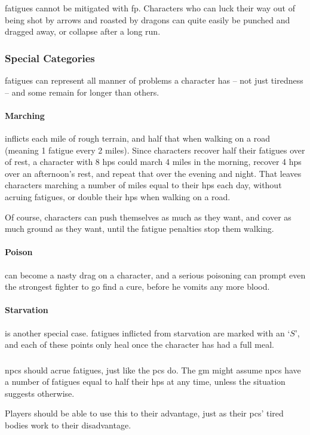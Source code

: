 \begin{multicols}{2}
\Glspl{fatigue} cannot be mitigated with \gls{fp}. Characters who can luck their way out of being shot by arrows and roasted by dragons can quite easily be punched and dragged away, or collapse after a long run.

\subsubsection{Special Categories}

\Glspl{fatigue} can represent all manner of problems a character has -- not just tiredness -- and some remain for longer than others.

\paragraph{Marching} inflicts  each mile of rough terrain, and half that when walking on a road (meaning 1 \gls{fatigue} every 2 miles).
Since characters recover half their \glspl{fatigue} over  of rest, a character with 8 \glspl{hp} could march 4 miles in the morning, recover 4 \glspl{hp} over an afternoon's rest, and repeat that over the evening and night.
That leaves characters marching a number of miles equal to their \glspl{hp} each day, without acruing \glspl{fatigue}, or double their \glspl{hp} when walking on a road.

Of course, characters can push themselves as much as they want, and cover as much ground as they want, until the \gls{fatigue} penalties stop them walking.

\paragraph{Poison} can become a nasty drag on a character, and a serious poisoning can prompt even the strongest fighter to go find a cure, before he vomits any more blood.

\paragraph{Starvation} is another special case.
\glspl{fatigue} inflicted from starvation are marked with an `$S$', and each of these points only heal once the character has had a full meal.

\subsubsection{}

\Glspl{npc} should acrue \glspl{fatigue}, just like the \glspl{pc} do.
The \gls{gm} might assume \glspl{npc} have a number of \glspl{fatigue} equal to half their \glspl{hp} at any time, unless the situation suggests otherwise.

Players should be able to use this to their advantage, just as their \glspl{pc}' tired bodies work to their disadvantage.

\end{multicols}
